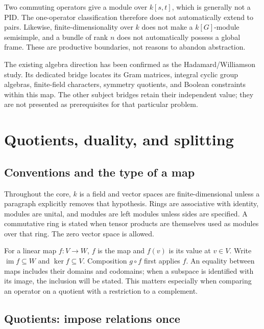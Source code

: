 \documentclass[
  11pt,
]{article}
\begin{document}
Two commuting operators give a module over \(k[s,t]\), which is
generally not a PID. The one-operator classification therefore does not
automatically extend to pairs. Likewise, finite-dimensionality over
\(k\) does not make a \(k[G]\)-module semisimple, and a bundle of rank
\(n\) does not automatically possess a global frame. These are
productive boundaries, not reasons to abandon abstraction.

The existing algebra direction has been confirmed as the
Hadamard/Williamson study. Its dedicated bridge locates its Gram
matrices, integral cyclic group algebras, finite-field characters,
symmetry quotients, and Boolean constraints within this map. The other
subject bridges retain their independent value; they are not presented
as prerequisites for that particular problem.

\section{Quotients, duality, and
splitting}\label{quotients-duality-and-splitting}

\subsection{Conventions and the type of a
map}\label{conventions-and-the-type-of-a-map}

Throughout the core, \(k\) is a field and vector spaces are
finite-dimensional unless a paragraph explicitly removes that
hypothesis. Rings are associative with identity, modules are unital, and
modules are left modules unless sides are specified. A commutative ring
is stated when tensor products are themselves used as modules over that
ring. The zero vector space is allowed.

For a linear map \(f:V\to W\), \(f\) is the map and \(f(v)\) is its
value at \(v\in V\). Write \(\operatorname{im}f\subseteq W\) and
\(\ker f\subseteq V\). Composition \(g\circ f\) first applies \(f\). An
equality between maps includes their domains and codomains; when a
subspace is identified with its image, the inclusion will be stated.
This matters especially when comparing an operator on a quotient with a
restriction to a complement.

\subsection{Quotients: impose relations
once}\label{quotients-impose-relations-once}
\end{document}
